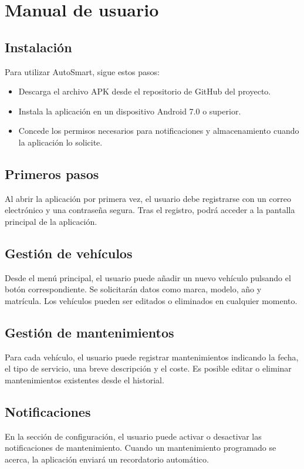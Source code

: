 \chapter{Manual de usuario}

\section{Instalación}
Para utilizar AutoSmart, sigue estos pasos:
\begin{itemize}
    \item Descarga el archivo APK desde el repositorio de GitHub del proyecto.
    \item Instala la aplicación en un dispositivo Android 7.0 o superior.
    \item Concede los permisos necesarios para notificaciones y almacenamiento cuando la aplicación lo solicite.
\end{itemize}

\section{Primeros pasos}
Al abrir la aplicación por primera vez, el usuario debe registrarse con un correo electrónico y una contraseña segura. Tras el registro, podrá acceder a la pantalla principal de la aplicación.

\section{Gestión de vehículos}
Desde el menú principal, el usuario puede añadir un nuevo vehículo pulsando el botón correspondiente. Se solicitarán datos como marca, modelo, año y matrícula. Los vehículos pueden ser editados o eliminados en cualquier momento.

\section{Gestión de mantenimientos}
Para cada vehículo, el usuario puede registrar mantenimientos indicando la fecha, el tipo de servicio, una breve descripción y el coste. Es posible editar o eliminar mantenimientos existentes desde el historial.

\section{Notificaciones}
En la sección de configuración, el usuario puede activar o desactivar las notificaciones de mantenimiento. Cuando un mantenimiento programado se acerca, la aplicación enviará un recordatorio automático.

